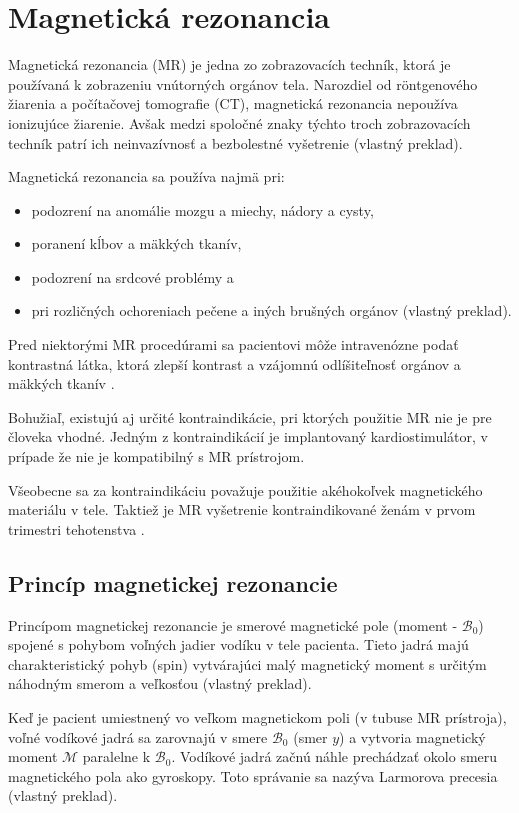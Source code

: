 \chapter {Magnetická rezonancia}
Magnetická rezonancia (MR) je jedna zo zobrazovacích techník, ktorá je používaná k zobrazeniu vnútorných orgánov tela.
Narozdiel od röntgenového žiarenia a počítačovej tomografie (CT), magnetická rezonancia nepoužíva ionizujúce žiarenie. Avšak medzi spoločné znaky týchto troch zobrazovacích techník patrí ich neinvazívnosť a bezbolestné vyšetrenie \cite{basic_principles_of_mri} (vlastný preklad).

Magnetická rezonancia sa používa najmä pri:
\begin {itemize}
\item {podozrení na anomálie mozgu a miechy, nádory a cysty,}
\item {poranení kĺbov a mäkkých tkanív,}
\item {podozrení na srdcové problémy a}
\item {pri rozličných ochoreniach pečene a iných brušných orgánov \cite{mr_usage} (vlastný preklad).}
\end {itemize}

Pred niektorými MR procedúrami sa pacientovi môže intravenózne podať kontrastná látka, ktorá zlepší kontrast a vzájomnú odlíšiteľnosť orgánov \newline a mäkkých tkanív \cite{contrast_agents}.

Bohužiaľ, existujú aj určité kontraindikácie, pri ktorých použitie MR nie je pre človeka vhodné.
Jedným z kontraindikácií je implantovaný kardiostimulátor, v prípade že nie je kompatibilný s MR prístrojom.
\clearpage

Všeobecne sa za kontraindikáciu považuje použitie akéhokoľvek magnetického materiálu v tele. Taktiež je MR vyšetrenie kontraindikované ženám v prvom trimestri tehotenstva \cite{mr_contraindications}.

\section {Princíp magnetickej rezonancie}
Princípom magnetickej rezonancie je smerové magnetické pole (moment - $\mathcal{B}_{0}$) spojené s pohybom voľných jadier vodíku v tele pacienta. Tieto jadrá majú charakteristický pohyb (spin) vytvárajúci malý magnetický moment s určitým náhodným smerom a veľkosťou  \cite{basic_principles_of_mri} (vlastný preklad).

Keď je pacient umiestnený vo veľkom magnetickom poli (v tubuse MR prístroja), voľné vodíkové jadrá sa zarovnajú v smere $\mathcal{B}_{0}$ (smer $y$) a vytvoria magnetický moment $\mathcal{M}$ paralelne k $\mathcal{B}_{0}$. Vodíkové jadrá začnú náhle prechádzať okolo smeru magnetického pola ako gyroskopy. Toto správanie sa nazýva Larmorova precesia \cite{basic_principles_of_mri} (vlastný preklad).

